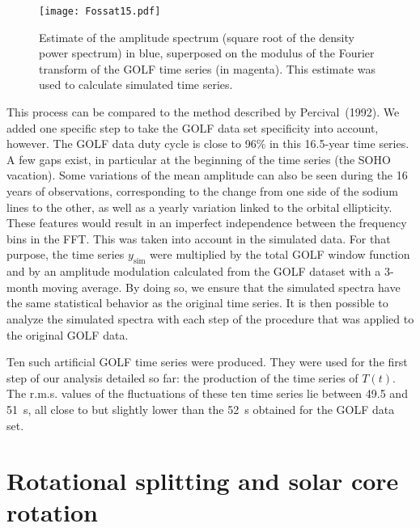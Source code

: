 \documentclass[bibyear]{aa}
\begin{document}
\begin{figure}
\label{fig:AmpSpec}
\centering
\texttt{[image: Fossat15.pdf]}
\caption{Estimate of the amplitude spectrum (square root of the density power spectrum) in blue, superposed on the modulus of the Fourier transform of the GOLF time series (in magenta). This estimate was used to calculate simulated time series.}
\end{figure} 

This process can be compared to the method described by Percival~(1992). We added one specific step to take the GOLF data set specificity
into account, however. The GOLF data duty cycle is close to 96\% in this 16.5-year time series. A few gaps exist, in particular at the beginning of the time series (the SOHO vacation). Some variations of the mean amplitude can also be seen during the 16 years of observations, corresponding to the change from one side of the sodium lines to the other, as well as a yearly variation linked to the  orbital ellipticity. These features would result in an imperfect independence between the frequency bins in the FFT. This was taken into account in the simulated data.  For that purpose, the time series $y_\mathrm{sim}$ were multiplied by the total GOLF window function and by an amplitude modulation calculated from the GOLF dataset with a 3-month moving average. By doing so, we ensure that the simulated spectra have the same statistical behavior as the original time series. It is then possible to analyze the simulated spectra with each step of the procedure that was applied to the original GOLF data.

Ten such artificial GOLF time series were produced. They were used for the first step of our analysis detailed so far:  the production of the time series of $T(t)$. The r.m.s. values of the fluctuations of these ten time series lie between 49.5 and 51~s, all close to but slightly lower than the 52~s obtained for the GOLF data set. 



\section{Rotational splitting and solar core rotation}
\end{document}

